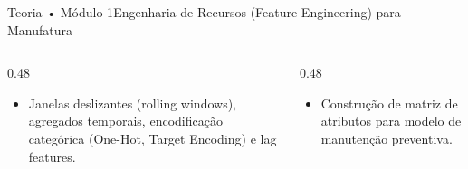 \begin{senaiframe}{Teoria • Módulo 1}{Engenharia de Recursos (Feature Engineering) para Manufatura}
  \begin{columns}[t]
    \begin{column}{0.48\textwidth}
      \begin{tcolorbox}[senaibluecard, title={Fundamentos Teóricos}]
        \begin{itemize}
          \item Janelas deslizantes (rolling windows), agregados temporais, encodificação categórica (One-Hot, Target Encoding) e lag features.
        \end{itemize}
      \end{tcolorbox}
    \end{column}
    \begin{column}{0.48\textwidth}
      \begin{tcolorbox}[senaigreencard, title={Prática \& Laboratório}]
        \begin{itemize}
          \item Construção de matriz de atributos para modelo de manutenção preventiva.
        \end{itemize}
      \end{tcolorbox}
    \end{column}
  \end{columns}
\end{senaiframe}
